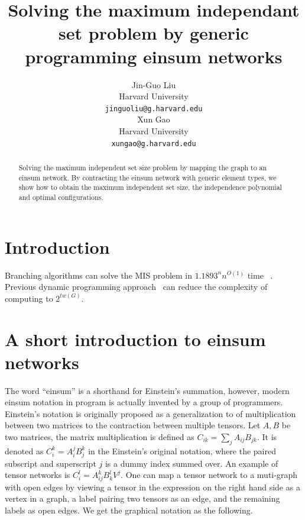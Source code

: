 \documentclass{article}
\newcommand{\<}{\langle}
\renewcommand{\>}{\rangle}
\renewcommand{\cite}[1]{{\citep{#1}}}
\theoremstyle{definition}\newtheorem{definition}{\textit{Definition}}
\begin{document}
\title{Solving the maximum independant set problem by generic programming einsum networks}

\author{Jin-Guo Liu\\
Harvard University\\
\texttt{jinguoliu@g.harvard.edu}\\
\AND
Xun Gao\\
Harvard University\\
\texttt{xungao@g.harvard.edu}\\
}
\maketitle

\begin{abstract}
	Solving the maximum independent set size problem by mapping the graph to an einsum network. 
    By contracting the einsum network with generic element types, we show how to obtain the maximum independent set size,
    the independence polynomial and optimal configurations.
\end{abstract}

\section{Introduction}
Branching algorithms can solve the MIS problem in $1.1893^n n ^{O(1)}$ time ~\cite{Xiao2017}.
Previous dynamic programming approach~\cite{Fomin2013} can reduce the complexity of computing to $2^{tw(G)}$.

\section{A short introduction to einsum networks}

The word ``einsum'' is a shorthand for Einstein's summation, however, modern einsum notation in program is actually invented by a group of programmers.
Einstein's notation is originally proposed as a generalization to of multiplication between two matrices to the contraction between multiple tensors.
Let $A, B$ be two matrices, the matrix multiplication is defined as $C_{ik} = \sum_{j}A_{ij}B_{jk}$.
It is denoted as $C_i^k = A_i^j B_j^k$ in the Einstein's original notation, where the paired subscript and superscript $j$ is a dummy index summed over.
An example of tensor networks is $C_i^l = A_{ij}^k B^l_k V^j$.
One can map a tensor network to a muti-graph with open edges by viewing a tensor in the expression on the right hand side as a vertex in a graph, a label pairing two tensors as an edge, and the remaining labels as open edges.
We get the graphical notation as the following.
\end{document}
